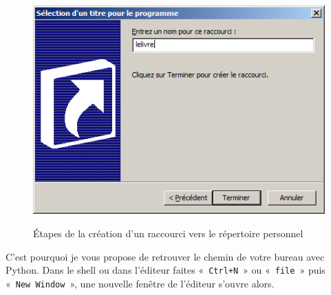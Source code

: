 \begin{figure}[h!tb]
{\includegraphics[scale=0.5]{images/comptera.png}
\label{fig:comptera}
}

\caption{Étapes de la création d'un raccourci vers le répertoire personnel}
\label{fig:etapesra}
\end{figure}


C'est pourquoi je vous propose de retrouver le chemin de votre bureau avec Python.
Dans le shell ou dans l'éditeur faites «~\texttt{Ctrl+N}~» ou «~\texttt{file}~» puis   
«~\texttt{New Window}~», une nouvelle fenêtre de l'éditeur s'ouvre alors.

